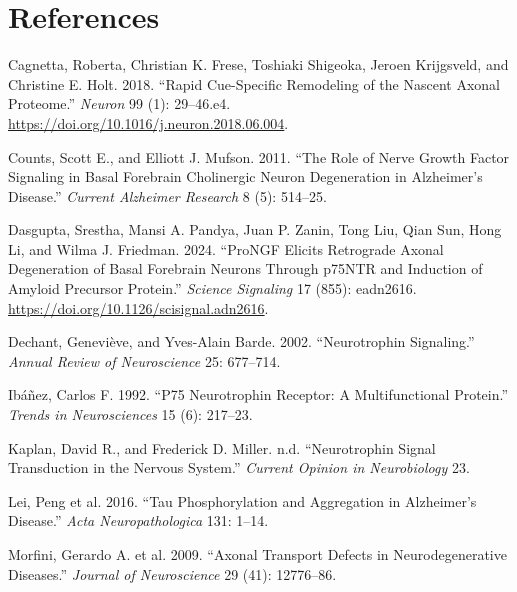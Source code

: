 \documentclass[
  letterpaper,
  DIV=11,
  numbers=noendperiod]{scrreprt}
\newlength{\cslhangindent}
\newenvironment{CSLReferences}[2] %
 {\begin{list}{}{%
  \setlength{\itemindent}{0pt}
  \setlength{\leftmargin}{0pt}
  \setlength{\parsep}{0pt}
  \ifodd #1
   \setlength{\leftmargin}{\cslhangindent}
   \setlength{\itemindent}{-1\cslhangindent}
  \fi
  \setlength{\itemsep}{#2\baselineskip}}}
 {\end{list}}
\begin{document}
\chapter*{References}\label{references}


\label{refs}
\begin{CSLReferences}{1}{0}
Cagnetta, Roberta, Christian K. Frese, Toshiaki Shigeoka, Jeroen
Krijgsveld, and Christine E. Holt. 2018. {``Rapid {Cue-Specific
Remodeling} of the {Nascent Axonal Proteome}.''} \emph{Neuron} 99 (1):
29--46.e4. \url{https://doi.org/10.1016/j.neuron.2018.06.004}.

Counts, Scott E., and Elliott J. Mufson. 2011. {``The Role of Nerve
Growth Factor Signaling in Basal Forebrain Cholinergic Neuron
Degeneration in {Alzheimer}'s Disease.''} \emph{Current Alzheimer
Research} 8 (5): 514--25.

Dasgupta, Srestha, Mansi A. Pandya, Juan P. Zanin, Tong Liu, Qian Sun,
Hong Li, and Wilma J. Friedman. 2024. {``{ProNGF} Elicits Retrograde
Axonal Degeneration of Basal Forebrain Neurons Through {p75NTR} and
Induction of Amyloid Precursor Protein.''} \emph{Science Signaling} 17
(855): eadn2616. \url{https://doi.org/10.1126/scisignal.adn2616}.

Dechant, Geneviève, and Yves-Alain Barde. 2002. {``Neurotrophin
Signaling.''} \emph{Annual Review of Neuroscience} 25: 677--714.

Ibáñez, Carlos F. 1992. {``P75 Neurotrophin Receptor: A Multifunctional
Protein.''} \emph{Trends in Neurosciences} 15 (6): 217--23.

Kaplan, David R., and Frederick D. Miller. n.d. {``Neurotrophin Signal
Transduction in the Nervous System.''} \emph{Current Opinion in
Neurobiology} 23.

Lei, Peng et al. 2016. {``Tau Phosphorylation and Aggregation in
{Alzheimer}'s Disease.''} \emph{Acta Neuropathologica} 131: 1--14.

Morfini, Gerardo A. et al. 2009. {``Axonal Transport Defects in
Neurodegenerative Diseases.''} \emph{Journal of Neuroscience} 29 (41):
12776--86.


\end{CSLReferences}
\end{document}
